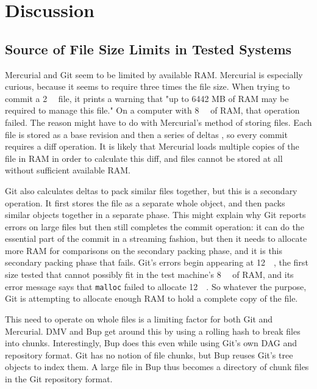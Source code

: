 \chapter{Discussion}


\section{Source of File Size Limits in Tested Systems}
\label{chunk-then-recombine}


Mercurial and Git seem to be limited by available RAM. Mercurial is especially
curious, because it seems to require three times the file size. When trying to
commit a \SI{2}{\gibi\byte} file, it prints a warning that "up to 6442 MB of RAM
may be required to manage this file." On a computer with \SI{8}{\gibi\byte} of
RAM, that operation failed. The reason might have to do with Mercurial's method
of storing files. Each file is stored as a base revision and then a series of
deltas \cite[Chapter 4]{hgbook}, so every commit requires a diff operation. It
is likely that Mercurial loads multiple copies of the file in RAM in order to
calculate this diff, and files cannot be stored at all without sufficient
available RAM.

Git also calculates deltas to pack similar files together, but this is a
secondary operation. It first stores the file as a separate whole object, and
then packs similar objects together in a separate phase. This might explain why
Git reports errors on large files but then still completes the commit operation:
it can do the essential part of the commit in a streaming fashion, but then it
needs to allocate more RAM for comparisons on the secondary packing phase, and
it is this secondary packing phase that fails. Git's errors begin appearing at
\SI{12}{\gibi\byte}, the first size tested that cannot possibly fit in the test
machine's \SI{8}{\gibi\byte} of RAM, and its error message says that
\lstinline{malloc} failed to allocate \SI{12}{\gibi\byte}. So whatever the
purpose, Git is attempting to allocate enough RAM to hold a complete copy of the
file.

This need to operate on whole files is a limiting factor for both Git and
Mercurial. DMV and Bup get around this by using a rolling hash to break files
into chunks. Interestingly, Bup does this even while using Git's own DAG and
repository format\cite{bup_design}. Git has no notion of file chunks, but Bup
reuses Git's tree objects to index them. A large file in Bup thus becomes a
directory of chunk files in the Git repository format.

